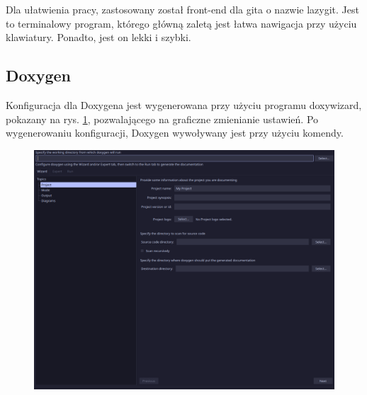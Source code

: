 Dla ułatwienia pracy, zastosowany został front-end dla gita o nazwie lazygit. Jest to terminalowy program, którego główną zaletą jest łatwa nawigacja przy użyciu klawiatury. Ponadto, jest on lekki i szybki.

\subsection{Doxygen}

Konfiguracja dla Doxygena jest wygenerowana przy użyciu programu doxywizard, pokazany na rys. \ref{fig:doxywizard}, pozwalającego na graficzne zmienianie ustawień. Po wygenerowaniu konfiguracji, Doxygen wywoływany jest przy użyciu komendy.

\begin{figure}[H]
	\centering
	\includegraphics[width=1\textwidth]{images/doxywizard.png}
	\caption{}
	\label{fig:doxywizard}
\end{figure}

